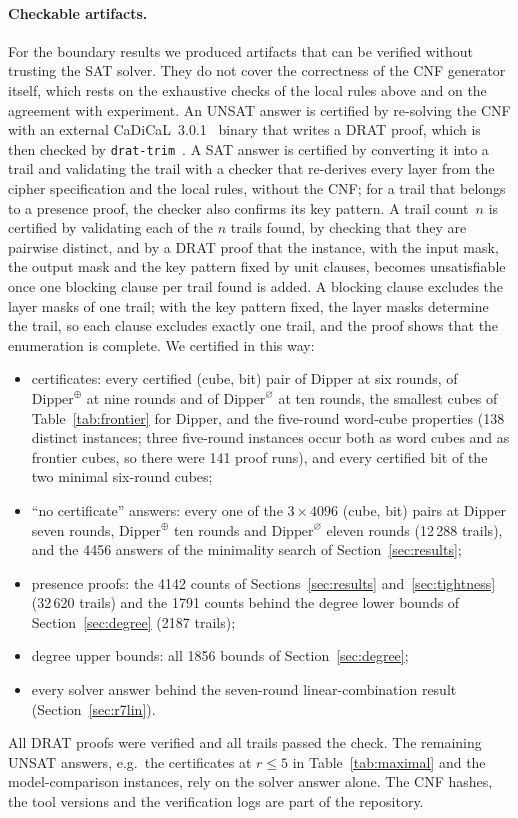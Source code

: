 \documentclass[pdflatex,sn-mathphys-num]{sn-jnl}
\theoremstyle{thmstyleone}
\theoremstyle{thmstylethree}
\theoremstyle{thmstyletwo}
\newcommand{\NUNSAT}{138}
\newcommand{\NWIT}{12\,288}
\newcommand{\NPRTR}{32\,620}
\newcommand{\NDEGPR}{1791}
\newcommand{\NDEGTR}{2187}
\begin{document}
\paragraph{Checkable artifacts.} For the boundary results we produced artifacts that can be verified without trusting the SAT solver. They do not cover the correctness of the CNF generator itself, which rests on the exhaustive checks of the local rules above and on the agreement with experiment. An UNSAT answer is certified by re-solving the CNF with an external CaDiCaL~3.0.1~\cite{cadical2024} binary that writes a DRAT proof, which is then checked by \texttt{drat-trim}~\cite{drattrim2014}. A SAT answer is certified by converting it into a trail and validating the trail with a checker that re-derives every layer from the cipher specification and the local rules, without the CNF; for a trail that belongs to a presence proof, the checker also confirms its key pattern. A trail count~$n$ is certified by validating each of the $n$ trails found, by checking that they are pairwise distinct, and by a DRAT proof that the instance, with the input mask, the output mask and the key pattern fixed by unit clauses, becomes unsatisfiable once one blocking clause per trail found is added. A blocking clause excludes the layer masks of one trail; with the key pattern fixed, the layer masks determine the trail, so each clause excludes exactly one trail, and the proof shows that the enumeration is complete. We certified in this way:
\begin{itemize}
\item certificates: every certified (cube, bit) pair of Dipper at six rounds, of $\mathrm{Dipper}^{\oplus}$ at nine rounds and of $\mathrm{Dipper}^{\varnothing}$ at ten rounds, the smallest cubes of Table~\ref{tab:frontier} for Dipper, and the five-round word-cube properties (\NUNSAT{} distinct instances; three five-round instances occur both as word cubes and as frontier cubes, so there were 141 proof runs), and every certified bit of the two minimal six-round cubes;
\item ``no certificate'' answers: every one of the $3\times4096$ (cube, bit) pairs at Dipper seven rounds, $\mathrm{Dipper}^{\oplus}$ ten rounds and $\mathrm{Dipper}^{\varnothing}$ eleven rounds (\NWIT{} trails), and the 4456 answers of the minimality search of Section~\ref{sec:results};
\item presence proofs: the 4142 counts of Sections~\ref{sec:results} and~\ref{sec:tightness} (\NPRTR{} trails) and the \NDEGPR{} counts behind the degree lower bounds of Section~\ref{sec:degree} (\NDEGTR{} trails);
\item degree upper bounds: all 1856 bounds of Section~\ref{sec:degree};
\item every solver answer behind the seven-round linear-combination result (Section~\ref{sec:r7lin}).
\end{itemize}
All DRAT proofs were verified and all trails passed the check. The remaining UNSAT answers, e.g.\ the certificates at $r\le5$ in Table~\ref{tab:maximal} and the model-comparison instances, rely on the solver answer alone. The CNF hashes, the tool versions and the verification logs are part of the repository.
\end{document}
